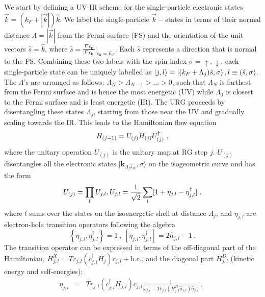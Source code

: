 \documentclass[reprint,onecolumn,prb,superscriptaddress]{revtex4-2}
\begin{document}
{We start by defining a UV-IR scheme for the single-particle electronic states \(\vec k = (k_F + |\vec k|) \hat k\). We label the single-particle \(\vec k-\)states in terms of their normal distance $\Lambda = |\vec k|$ from the Fermi surface (FS) and the orientation of the unit vectors $\hat{s} = \hat k$, where $\hat{s}=\frac{\nabla\epsilon_{\mathbf{k}}}{|\nabla\epsilon_{\mathbf{k}}|}|_{\epsilon_{\mathbf{k}}=E_{F}}$. Each \(\hat s\) represents a direction that is normal to the FS. Combining these two labels with the spin index \(\sigma=\uparrow,\downarrow\), each single-particle state can be uniquely labelled as $\ket{j,l} = \ket{(k_F + \Lambda_j) \hat s,\sigma}, l\equiv (\hat{s},\sigma)$. The $\Lambda$'s are arranged as follows: $\Lambda_{N}>\Lambda_{N-1}>\ldots>0$, such that \(\Lambda_N\) is farthest from the Fermi surface and is hence the most energetic (UV) while \(\Lambda_0\) is closest to the Fermi surface and is least energetic (IR). The URG proceeds by disentangling these states \(\Lambda_j\), starting from those near the UV and gradually scaling towards the IR. This leads to the Hamiltonian flow equation~\cite{anirbanurg1}
\begin{equation}
\centering
\label{urg_map}
H_{(j-1)}=U_{(j)}H_{(j)}U^{\dagger}_{(j)}~,
\end{equation}
where the unitary operation $U_{(j)}$ is the unitary map at RG step $j$. 
$U_{(j)}$ disentangles all the electronic states 
$|\mathbf{k}_{\Lambda_{j}\hat{s}_{m}},\sigma\rangle$
on the isogeometric curve and has the form~\cite{anirbanmott1,anirbanurg1}
\begin{equation}
\centering U_{(j)}=\prod_{l}U_{j,l}, U_{j,l}=\frac{1}{\sqrt{2}}\sum_l [1+\eta_{j,l}-\eta^{\dagger}_{j,l}]~,
\end{equation}
where \(l\) sums over the states on the isoenergetic shell at distance \(\Lambda_j\), and $\eta_{j,l}$ are electron-hole transition operators following the algebra
\begin{equation}
	\left\{\eta_{j,l},\eta_{j,l}^{\dagger}\right\} = 1~,~\left[\eta_{j,l},\eta_{j,l}^{\dagger}\right] = 2\hat n_{j,l} - 1~.
\end{equation}
The transition operator can be expressed in terms of the off-diagonal part of the Hamiltonian, \(H^X_{j,l} = Tr_{j,l}(c^{\dagger}_{j,l}H_{j})c_{j,l} + \text{h.c.}\), and the diagonal part \(H^D_{j,l}\) (kinetic energy and self-energies):
\begin{eqnarray}
	\eta_{j,l}&=&Tr_{j,l}(c^{\dagger}_{j,l}H_{j,l})c_{j,l}\frac{1}{\hat{\omega}_{j,l}-Tr_{j,l}(H^{D}_{j,l}\hat{n}_{j,l})\hat{n}_{j,l}}~.~~\label{e-TransOp}

\end{eqnarray}}
\end{document}
